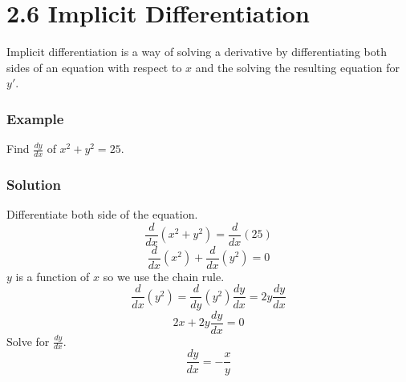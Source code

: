 %
%

\section*{2.6 Implicit Differentiation}

Implicit differentiation is a way of solving a derivative by differentiating both sides of an equation with respect to \(x\) and the solving the resulting equation for \(y'\).

\subsubsection*{Example}

Find \(\frac{dy}{dx} \) of \( x^2+y^2=25 \).

\subsubsection*{Solution}

Differentiate both side of the equation.
$$ \frac{d}{dx}(x^2+y^2) = \frac{d}{dx}(25) $$
$$ \frac{d}{dx}(x^2)+\frac{d}{dx}(y^2)=0$$
\(y\) is a function of \(x\) so we use the chain rule.
$$ \frac{d}{dx}(y^2) = \frac{d}{dy} (y^2) \frac{dy}{dx} = 2y\frac{dy}{dx}$$
$$ 2x + 2y \frac{dy}{dx} = 0 $$
Solve for \(\frac{dy}{dx}\).
$$ \frac{dy}{dx}=-\frac{x}{y} $$
